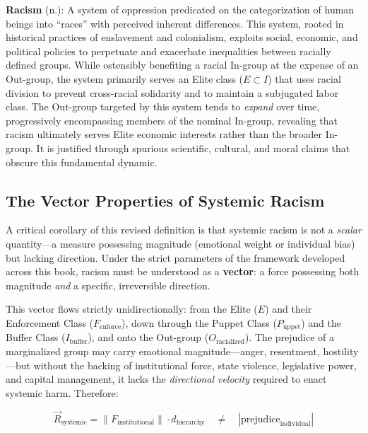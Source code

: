 \documentclass[12pt,openany]{book}
\begin{document}
\begin{definition}
\textbf{Racism} (n.): A system of oppression predicated on the categorization of human beings into ``races'' with perceived inherent differences. This system, rooted in historical practices of enslavement and colonialism, exploits social, economic, and political policies to perpetuate and exacerbate inequalities between racially defined groups. While ostensibly benefiting a racial In-group at the expense of an Out-group, the system primarily serves an Elite class ($E \subset I$) that uses racial division to prevent cross-racial solidarity and to maintain a subjugated labor class. The Out-group targeted by this system tends to \textit{expand} over time, progressively encompassing members of the nominal In-group, revealing that racism ultimately serves Elite economic interests rather than the broader In-group. It is justified through spurious scientific, cultural, and moral claims that obscure this fundamental dynamic.
\end{definition}

\subsection*{The Vector Properties of Systemic Racism}

A critical corollary of this revised definition is that systemic racism is not a \textit{scalar} quantity---a measure possessing magnitude (emotional weight or individual bias) but lacking direction. Under the strict parameters of the framework developed across this book, racism must be understood as a \textbf{vector}: a force possessing both magnitude \textit{and} a specific, irreversible direction.

This vector flows strictly unidirectionally: from the Elite ($E$) and their Enforcement Class ($F_{\text{enforce}}$), down through the Puppet Class ($P_{\text{uppet}}$) and the Buffer Class ($I_{\text{buffer}}$), and onto the Out-group ($O_{\text{racialized}}$). The prejudice of a marginalized group may carry emotional magnitude---anger, resentment, hostility---but without the backing of institutional force, state violence, legislative power, and capital management, it lacks the \textit{directional velocity} required to enact systemic harm. Therefore:

\[
\vec{R}_{\text{systemic}} = \left\| F_{\text{institutional}} \right\| \cdot \hat{d}_{\text{hierarchy}} \quad \neq \quad \left| \text{prejudice}_{\text{individual}} \right|
\]
\end{document}
